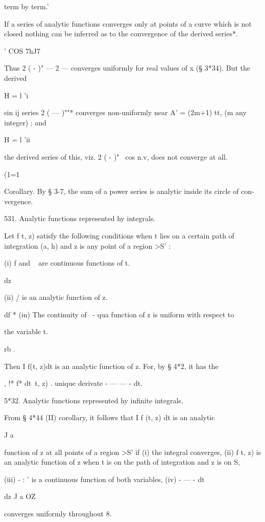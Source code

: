 {{term by term.' 

If a series of analytic functions converges only at points of a curve which is not closed 
nothing can be inferred as to the convergence of the derived series*. 

'  COS 7hJ7 

Thus 2 ( - )" — 2 — converges uniformly for real values of x (§ 3*34). But the derived 

H = l 'i 

  sin  ij  
series 2 ( — )""* converges non-uniformly near A' = (2m+1) tt, (m any integer) ; and 

H = l 'ii 

the derived series of this, viz. 2 ( - )"~  cos n.v, does not converge at all. 

(1=1 

Corollary. By § 3-7, the sum of a power series is analytic inside its circle of con- 
vergence. 

531. Analytic functions represented hy integrals. 

Let f t, z) satisfy the following conditions when t lies on a certain path 
of integration (a, h) and z is any point of a region >S' : 

(i) f and ~ are continuous functions of t. 

   dz 

(ii) / is an analytic function of z. 

df * 
(in) The continuity of ~- qua function of z is uniform with respect to 

the variable t. 

rb   . 

Then I f(t, z)dt is an analytic function of z. For, by § 4*2, it has the 

, !*   f* dt\ t, z) . 
unique derivate - —   — - dt. 

5*32. Analytic functions represented hy infinite integrals. 

From § 4*44 (II) corollary, it follows that I f (t, z) dt is an analytic 

J a 

function of z at all points of a region >S' if (i) the integral converges, (ii) f t, z) 
is an analytic function of z when t is on the path of integration and z is on S, 

(iii) - : ' is a continuous function of both variables, (iv) -   — - dt 

dz J a OZ 

converges uniformly throughout 8. 

}}
